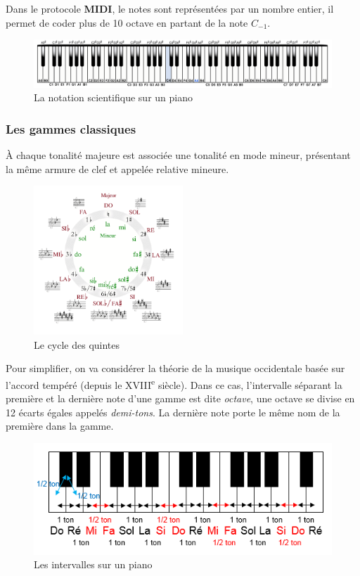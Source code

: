 \documentclass[]{article}
\begin{document}
Dans le protocole \textbf{MIDI}, le notes sont représentées par un
nombre entier, il permet de coder plus de 10 octave en partant de la
note \(C_{-1}\).

\begin{figure}
\centering
\includegraphics[width=1\textwidth,height=\textheight]{img/piano-keys.png}
\caption{La notation scientifique sur un piano}
\end{figure}

\hypertarget{les-gammes-classiques}{%
\subsubsection{Les gammes classiques}\label{les-gammes-classiques}}

À chaque tonalité majeure est associée une tonalité en mode mineur,
présentant la même armure de clef et appelée relative mineure.

\begin{figure}
\centering
\includegraphics[width=0.5\textwidth,height=\textheight]{img/cycle-des-quintes.png}
\caption{Le cycle des quintes}
\end{figure}

Pour simplifier, on va considérer la théorie de la musique occidentale
basée sur l'accord tempéré (depuis le XVIII\textsuperscript{e} siècle).
Dans ce cas, l'intervalle séparant la première et la dernière note d'une
gamme est dite \emph{octave}, une octave se divise en 12 écarts égales
appelés \emph{demi-tons}. La dernière note porte le même nom de la
première dans la gamme.

\begin{figure}
\centering
\includegraphics[width=1\textwidth,height=\textheight]{img/intervalles-piano.png}
\caption{Les intervalles sur un piano}
\end{figure}
\end{document}
